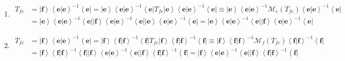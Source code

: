 \documentclass[aps,preprint]{revtex4}%
\begin{document}
\begin{enumerate}
\item
\begin{align}
T_{fe}  &  =\left\vert \mathbf{f}\right\rangle \left\langle \left.
\mathbf{e}\right\vert \mathbf{e}\right\rangle ^{-1}\left\langle \mathbf{e}%
\right\vert =\left\vert \mathbf{e}\right\rangle \left\langle \left.
\mathbf{e}\right\vert \mathbf{e}\right\rangle ^{-1}\left\langle \mathbf{e}%
\right\vert T_{fe}\left\vert \mathbf{e}\right\rangle \left\langle \left.
\mathbf{e}\right\vert \mathbf{e}\right\rangle ^{-1}\left\langle \mathbf{e}%
\right\vert \equiv\left\vert \mathbf{e}\right\rangle \left\langle \left.
\mathbf{e}\right\vert \mathbf{e}\right\rangle ^{-1}\mathcal{M}_{e}\left(
T_{fe}\right)  \left\langle \left.  \mathbf{e}\right\vert \mathbf{e}%
\right\rangle ^{-1}\left\langle \mathbf{e}\right\vert \\
&  =\left\vert \mathbf{e}\right\rangle \left\langle \left.  \mathbf{e}%
\right\vert \mathbf{e}\right\rangle ^{-1}\left\langle \mathbf{e}\right\vert
\left\vert \mathbf{f}\right\rangle \left\langle \left.  \mathbf{e}\right\vert
\mathbf{e}\right\rangle ^{-1}\left\langle \mathbf{e}\right\vert \left\vert
\mathbf{e}\right\rangle \left\langle \left.  \mathbf{e}\right\vert
\mathbf{e}\right\rangle ^{-1}\left\langle \mathbf{e}\right\vert =\left\vert
\mathbf{e}\right\rangle \left\langle \left.  \mathbf{e}\right\vert
\mathbf{e}\right\rangle ^{-1}\left\langle \mathbf{e}\right\vert \left\vert
\mathbf{f}\right\rangle \left\langle \left.  \mathbf{e}\right\vert
\mathbf{e}\right\rangle ^{-1}\left\langle \mathbf{e}\right\vert
\end{align}


\item
\begin{align}
T_{fe}  &  =\left\vert \mathbf{f}\right\rangle \left\langle \left.
\mathbf{e}\right\vert \mathbf{e}\right\rangle ^{-1}\left\langle \mathbf{e}%
\right\vert =\left\vert \mathbf{f}\right\rangle \left\langle \left.
\mathbf{f}\right\vert \mathbf{f}\right\rangle ^{-1}\left\langle \mathbf{f}%
\right\vert T_{fe}\left\vert \mathbf{f}\right\rangle \left\langle \left.
\mathbf{f}\right\vert \mathbf{f}\right\rangle ^{-1}\left\langle \mathbf{f}%
\right\vert \equiv\left\vert \mathbf{f}\right\rangle \left\langle \left.
\mathbf{f}\right\vert \mathbf{f}\right\rangle ^{-1}\mathcal{M}_{f}\left(
T_{fe}\right)  \left\langle \left.  \mathbf{f}\right\vert \mathbf{f}%
\right\rangle ^{-1}\left\langle \mathbf{f}\right\vert \\
&  =\left\vert \mathbf{f}\right\rangle \left\langle \left.  \mathbf{f}%
\right\vert \mathbf{f}\right\rangle ^{-1}\left\langle \mathbf{f}\right\vert
\left\vert \mathbf{f}\right\rangle \left\langle \left.  \mathbf{e}\right\vert
\mathbf{e}\right\rangle ^{-1}\left\langle \mathbf{e}\right\vert \left\vert
\mathbf{f}\right\rangle \left\langle \left.  \mathbf{f}\right\vert
\mathbf{f}\right\rangle ^{-1}\left\langle \mathbf{f}\right\vert =\left\vert
\mathbf{f}\right\rangle \left\langle \left.  \mathbf{e}\right\vert
\mathbf{e}\right\rangle ^{-1}\left\langle \mathbf{e}\right\vert \left\vert
\mathbf{f}\right\rangle \left\langle \left.  \mathbf{f}\right\vert
\mathbf{f}\right\rangle ^{-1}\left\langle \mathbf{f}\right\vert
\end{align}



\end{enumerate}
\end{document}
